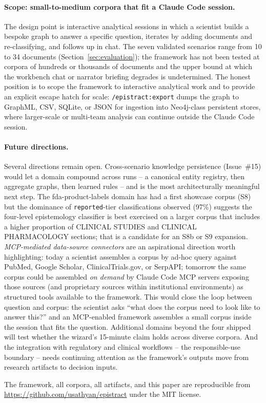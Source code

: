 \paragraph{Scope: small-to-medium corpora that fit a Claude Code session.} The design point is interactive analytical sessions in which a scientist builds a bespoke graph to answer a specific question, iterates by adding documents and re-classifying, and follows up in chat. The seven validated scenarios range from 10 to 34 documents (Section~\ref{sec:evaluation}); the framework has not been tested at corpora of hundreds or thousands of documents and the upper bound at which the workbench chat or narrator briefing degrades is undetermined. The honest position is to scope the framework to interactive analytical work and to provide an explicit escape hatch for scale: \texttt{/epistract:export} dumps the graph to GraphML, CSV, SQLite, or JSON for ingestion into Neo4j-class persistent stores, where larger-scale or multi-team analysis can continue outside the Claude Code session.

\paragraph{Future directions.} Several directions remain open. Cross-scenario knowledge persistence (Issue~\#15) would let a domain compound across runs -- a canonical entity registry, then aggregate graphs, then learned rules -- and is the most architecturally meaningful next step. The fda-product-labels domain has had a first showcase corpus (S8) but the dominance of \texttt{reported}-tier classifications observed (97\%) suggests the four-level epistemology classifier is best exercised on a larger corpus that includes a higher proportion of CLINICAL STUDIES and CLINICAL PHARMACOLOGY sections; that is a candidate for an S8b or S9 expansion. \emph{MCP-mediated data-source connectors} are an aspirational direction worth highlighting: today a scientist assembles a corpus by ad-hoc query against PubMed, Google Scholar, ClinicalTrials.gov, or SerpAPI; tomorrow the same corpus could be assembled \emph{on demand} by Claude Code MCP servers exposing those sources (and proprietary sources within institutional environments) as structured tools available to the framework. This would close the loop between question and corpus: the scientist asks ``what does the corpus need to look like to answer this?'' and an MCP-enabled framework assembles a small corpus inside the session that fits the question. Additional domains beyond the four shipped will test whether the wizard's 15-minute claim holds across diverse corpora. And the integration with regulatory and clinical workflows -- the responsible-use boundary -- needs continuing attention as the framework's outputs move from research artifacts to decision inputs.

The framework, all corpora, all artifacts, and this paper are reproducible from \url{https://github.com/usathyan/epistract} under the MIT license.

